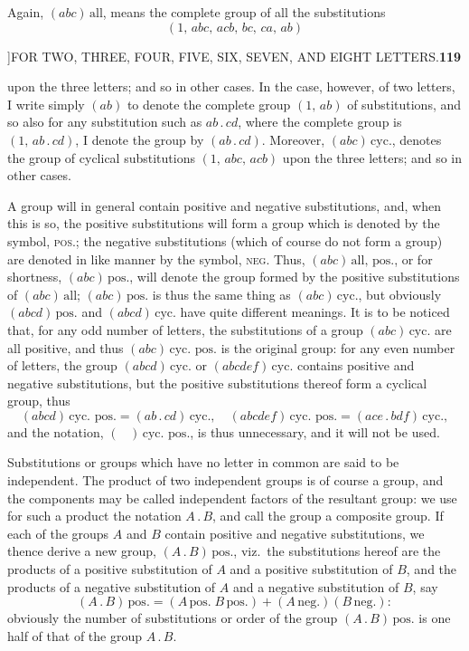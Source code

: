 \documentclass[11pt]{article}
\begin{document}
\hspace{1em} Again, $(abc)\,\text{all}$, means the complete group of all the
substitutions
\[
(1,\,abc,\,acb,\,bc,\,ca,\,ab)
\]

\newpage
{}]\hfill FOR TWO, THREE, FOUR, FIVE, SIX, SEVEN, AND EIGHT LETTERS.\hfill\textbf{119}

\smallskip
upon the three letters; and so in other cases. In the case, however, of two
letters, I write simply $(ab)$ to denote the complete group $(1,\,ab)$ of
substitutions, and so also for any substitution such as $ab\,.\,cd$, where
the complete group is $(1,\,ab\,.\,cd)$, I denote the group by
$(ab\,.\,cd)$. Moreover, $(abc)\,\text{cyc.}$, denotes the group of cyclical
substitutions $(1,\,abc,\,acb)$ upon the three letters; and so in other
cases.

\hspace{1em} A group will in general contain positive and negative
substitutions, and, when this is so, the positive substitutions will form a
group which is denoted by the symbol, \textsc{pos.}; the negative
substitutions (which of course do not form a group) are denoted in like
manner by the symbol, \textsc{neg.} Thus, $(abc)\,\text{all},\,\text{pos.}$,
or for shortness, $(abc)\,\text{pos.}$, will denote the group formed by the
positive substitutions of $(abc)\,\text{all}$; $(abc)\,\text{pos.}$ is thus
the same thing as $(abc)\,\text{cyc.}$, but obviously
$(abcd)\,\text{pos.}$ and $(abcd)\,\text{cyc.}$ have quite different
meanings. It is to be noticed that, for any odd number of letters, the
substitutions of a group $(abc)\,\text{cyc.}$ are all positive, and thus
$(abc)\,\text{cyc.\ pos.}$ is the original group: for any even number of
letters, the group $(abcd)\,\text{cyc.}$ or $(abcdef)\,\text{cyc.}$ contains
positive and negative substitutions, but the positive substitutions thereof
form a cyclical group, thus
\[
(abcd)\,\text{cyc.\ pos.}=(ab\,.\,cd)\,\text{cyc.},\quad
(abcdef)\,\text{cyc.\ pos.}=(ace\,.\,bdf)\,\text{cyc.},
\]
and the notation, $(\;\;\;)\,\text{cyc.\ pos.}$, is thus unnecessary, and it
will not be used.

\hspace{1em} Substitutions or groups which have no letter in common are said
to be independent. The product of two independent groups is of course a
group, and the components may be called independent factors of the resultant
group: we use for such a product the notation $A\,.\,B$, and call the group a
composite group. If each of the groups $A$ and $B$ contain positive and
negative substitutions, we thence derive a new group,
$(A\,.\,B)\,\text{pos.}$, viz.\ the substitutions hereof are the products of
a positive substitution of $A$ and a positive substitution of $B$, and the
products of a negative substitution of $A$ and a negative substitution of
$B$, say
\[
(A\,.\,B)\,\text{pos.}=(A\,\text{pos.}\;B\,\text{pos.})+(A\,\text{neg.})(B\,\text{neg.}):
\]
obviously the number of substitutions or order of the group
$(A\,.\,B)\,\text{pos.}$ is one half of that of the group $A\,.\,B$.
\end{document}
